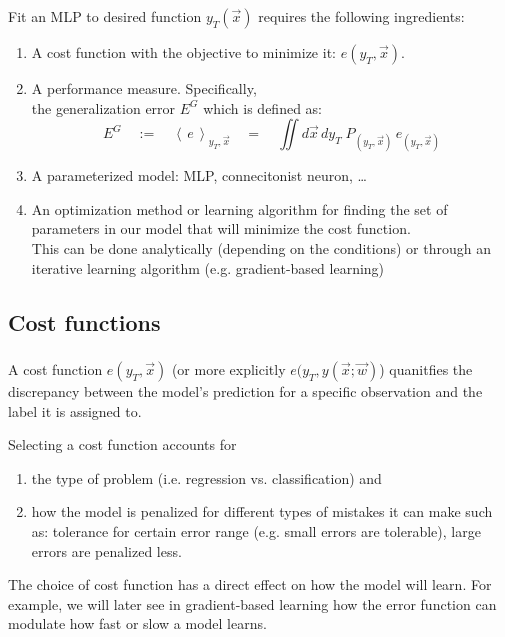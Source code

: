\begin{frame}\frametitle{\subsecname}


Fit an MLP to desired function $y_T(\vec x)$ requires the following ingredients:

\begin{enumerate}
\item A cost function with the objective to minimize it: $e(y_T, \vec x)$.
\item A performance measure. Specifically, \\

the generalization error $E^G$ which is defined as:	
\begin{equation} 
			E^G \quad := \quad \left<\,e\,\right>_{y_T, \vec{x}} 
			\quad = \quad \iint d \vec{x} \, dy_T \; 
				P_{(y_T, \vec{x})} \, e_{(y_T, \vec{x})}
\end{equation}

\item A parameterized model: MLP, connecitonist neuron, \ldots
\item An optimization method or learning algorithm for finding the set of parameters in our model that will minimize the cost function.\\
This can be done analytically (depending on the conditions) or through an iterative learning algorithm (e.g. gradient-based learning)
\end{enumerate}

\end{frame}

\subsection{Cost functions}
\begin{frame}\frametitle{\subsecname}

A cost function $e(y_T, \vec x)$ (or more explicitly $e(y_T, y(\vec x; \vec w)$) quanitfies the discrepancy between the model's prediction for a specific observation and the label it is assigned to.

Selecting a cost function accounts for 
\begin{enumerate}
\item the type of problem (i.e. regression vs. classification) and 
\item how the model is penalized for different types of mistakes it can make such as:
tolerance for certain error range (e.g. small errors are tolerable), large errors are penalized less.
\end{enumerate}

The choice of cost function has a direct effect on how the model will learn. For example, we will later see in gradient-based learning how the error function can modulate how fast or slow  a model learns.

\end{frame}


